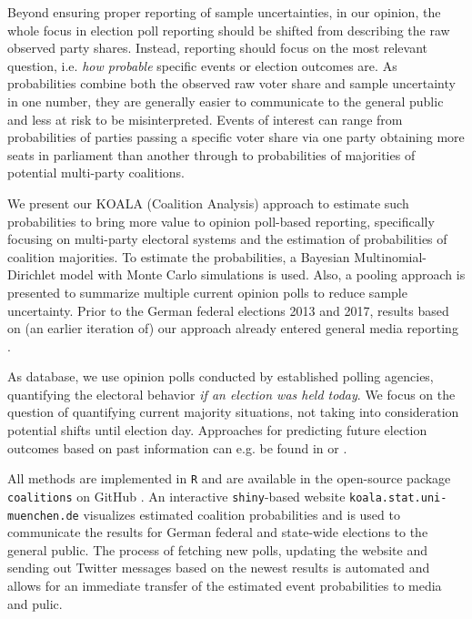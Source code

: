 \documentclass[smallcondensed]{svjour3}     %
\begin{document}

Beyond ensuring proper reporting of sample uncertainties, in our opinion, the
whole focus in election poll reporting should be shifted from describing the raw
observed party shares. Instead, reporting should focus on the most relevant
question, i.e. {\it how probable} specific events or election outcomes are.
As probabilities combine both the observed raw voter share
and sample uncertainty in one number, they are generally easier to
communicate to the general public and less at risk to be misinterpreted.
Events of interest can range from probabilities of parties passing
a specific voter share via one party obtaining more seats in parliament
than another through to probabilities of majorities of potential multi-party coalitions.

We present our KOALA (Coalition Analysis) approach to estimate such probabilities
to bring more value to opinion poll-based reporting, specifically focusing on
multi-party electoral systems and the estimation of probabilities of coalition
majorities. To estimate the probabilities, a Bayesian Multinomial-Dirichlet model
with Monte Carlo simulations is used. Also, a pooling approach is presented to summarize
multiple current opinion polls to reduce sample uncertainty.
Prior to the German federal elections 2013 and 2017, results based on (an earlier iteration of)
our approach already entered general media reporting \citep[cf.][]{wahlistik_2013, gelitz_2017}.

As database, we use opinion polls conducted by established polling agencies,
quantifying the electoral behavior \textit{if an election was held today}.
We focus on the question of quantifying current majority situations, not
taking into consideration potential shifts until election day.
Approaches for predicting future election outcomes based on past
information can e.g. be found in \citet{graefe_2017} or \citet{norpoth_gschwend_2010}.

All methods are implemented in \texttt{R} \citep{r_2017} and are available in the open-source
package \texttt{coalitions} on GitHub \citep{bender_bauer_2018}. An
interactive \texttt{shiny}-based \citep{chang_2017} website \texttt{koala.stat.uni-\allowbreak muenchen.\allowbreak de}
visualizes estimated coalition probabilities and is used to communicate the results
for German federal and state-wide elections to the general public.
The process of fetching new polls, updating the website and sending out Twitter messages based on the newest results is automated and allows for an immediate transfer of the estimated event probabilities to media and pulic.
\end{document}
